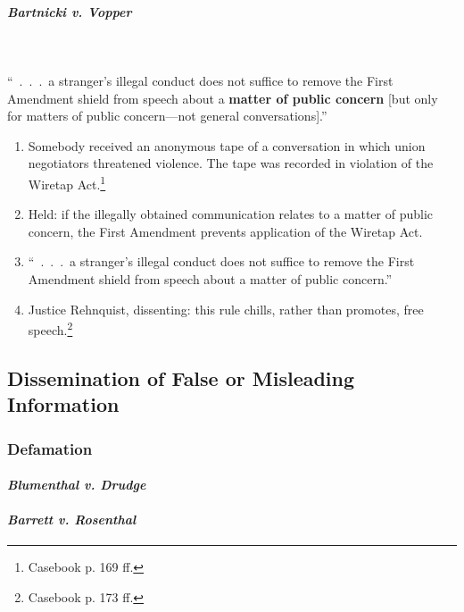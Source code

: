 \paragraph{\emph{Bartnicki v. Vopper}}
~\\\\
``~.~.~.~a stranger's illegal conduct does not suffice to remove the First 
Amendment shield from speech about a \textbf{matter of public concern} [but only 
for matters of public concern---not general conversations].''

\begin{enumerate}
    \item Somebody received an anonymous tape of a conversation in which union 
    negotiators threatened violence. The tape was recorded in violation of the 
    Wiretap Act.\footnote{Casebook p. 169 ff.}
    \item Held: if the illegally obtained communication relates to a matter of 
    public concern, the First Amendment prevents application of the Wiretap Act. 
    \item ``~.~.~.~a stranger's illegal conduct does not suffice to remove the First 
    Amendment shield from speech about a matter of public concern.''
    \item Justice Rehnquist, dissenting: this rule chills, rather than promotes, 
    free speech.\footnote{Casebook p. 173 ff.}
\end{enumerate}

\subsection{Dissemination of False or Misleading Information}

\subsubsection{Defamation}


\paragraph{\emph{Blumenthal v. Drudge}}


\paragraph{\emph{Barrett v. Rosenthal}}


